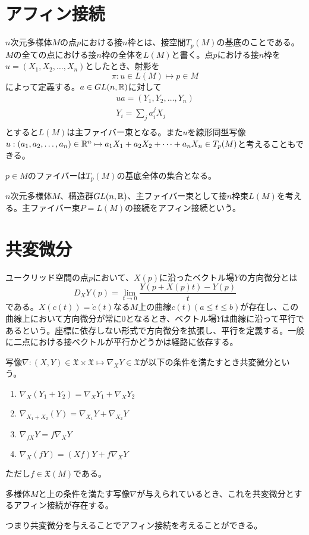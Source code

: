 
\section{アフィン接続}
	\begin{dfn}
		$n$次元多様体$M$の点$p$における接$n$枠とは、接空間$T_p(M)$の基底のことである。$M$の全ての点における接$n$枠の全体を$L(M)$と書く。点$p$における接$n$枠を$u = (X_1, X_2, \dots, X_n)$としたとき、射影を
			\[\pi: u \in L(M) \mapsto p \in M\]
		によって定義する。$a \in GL(n, \mathbb{R})$に対して
		\begin{gather*}
			ua = (Y_1, Y_2, \dots, Y_n)\\
			Y_i = \sum_j a_i^jX_j\\
		\end{gather*}
		とすると$L(M)$は主ファイバー束となる。また$u$を線形同型写像$u: (a_1, a_2, \dots, a_n) \in \mathbb{R}^n \mapsto a_1X_1 + a_2X_2 + \dots + a_nX_n \in T_p(M)$と考えることもできる。
	\end{dfn}
	$p \in M$のファイバーは$T_p(M)$の基底全体の集合となる。

	$n$次元多様体$M$、構造群$GL(n, \mathbb{R})$、主ファイバー束として接$n$枠束$L(M)$を考える。主ファイバー束$P = L(M)$の接続をアフィン接続という。

\section{共変微分}
	ユークリッド空間の点$p$において、$X(p)$に沿ったベクトル場$Y$の方向微分とは
		\[D_XY(p) = \lim_{t \to 0} \frac{Y(p + X(p)t) - Y(p)}{t}\]
	である。$X(c(t)) = \dot{c}(t)$なる$M$上の曲線$c(t)(a \leq t \leq b)$が存在し、この曲線上において方向微分が常に0となるとき、ベクトル場$Y$は曲線に沿って平行であるという。座標に依存しない形式で方向微分を拡張し、平行を定義する。一般に二点における接ベクトルが平行かどうかは経路に依存する。
	\begin{dfn}[共変微分]
		写像$\nabla: (X, Y) \in \mathfrak{X} \times \mathfrak{X} \mapsto \nabla_XY \in \mathfrak{X}$が以下の条件を満たすとき共変微分という。
		\begin{enumerate}
			\item $\nabla_X(Y_1 + Y_2) = \nabla_XY_1 + \nabla_XY_2$
			\item $\nabla_{X_1 + X_2}(Y) = \nabla_{X_1}Y + \nabla_{X_2}Y$
			\item $\nabla_{fX}Y = f\nabla_XY$
			\item $\nabla_X(fY) = (Xf)Y + f\nabla_XY$
		\end{enumerate}
		ただし$f \in \mathfrak{X}(M)$である。
	\end{dfn}
	\begin{thm}
		多様体$M$と上の条件を満たす写像$\nabla$が与えられているとき、これを共変微分とするアフィン接続が存在する。
	\end{thm}
	つまり共変微分を与えることでアフィン接続を考えることができる。

